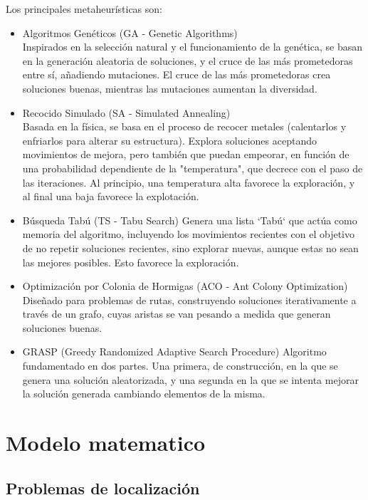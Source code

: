 \documentclass[12pt,a4paper]{book}
\begin{document}
Los principales metaheurísticas son:
\begin{itemize}
    \item Algoritmos Genéticos (GA - Genetic Algorithms)\\
    Inspirados en la selección natural y el funcionamiento de la genética, se basan en la generación aleatoria de soluciones, y el cruce de las más prometedoras entre sí, 
    añadiendo mutaciones. El cruce de las más prometedoras crea soluciones buenas, mientras las mutaciones aumentan la diversidad.
    \item Recocido Simulado (SA - Simulated Annealing)\\
    Basada en la física, se basa en el proceso de recocer metales (calentarlos y enfriarlos para alterar su estructura). Explora soluciones aceptando movimientos de mejora, pero también que puedan empeorar, 
    en función de una probabilidad dependiente de la "temperatura", que decrece con el paso de las iteraciones. Al principio, una temperatura alta favorece la exploración, y al final una baja favorece la explotación.
    \item Búsqueda Tabú (TS - Tabu Search)
    Genera una lista `Tabú` que actúa como memoria del algoritmo, incluyendo los movimientos recientes con el objetivo de no repetir soluciones recientes, sino explorar nuevas, aunque estas no sean las mejores posibles. Esto favorece la exploración.
    \item Optimización por Colonia de Hormigas (ACO - Ant Colony Optimization)
    Diseñado para problemas de rutas, construyendo soluciones iterativamente a través de un grafo, cuyas aristas  se van pesando a medida que generan soluciones buenas.
    \item GRASP (Greedy Randomized Adaptive Search Procedure)
    Algoritmo fundamentado en dos partes. Una primera, de construcción, en la que se genera una solución aleatorizada, y una segunda en la que se intenta mejorar la solución generada cambiando elementos de la misma.
\end{itemize}




\chapter{Modelo matematico}

\section{Problemas de localización}
\end{document}

